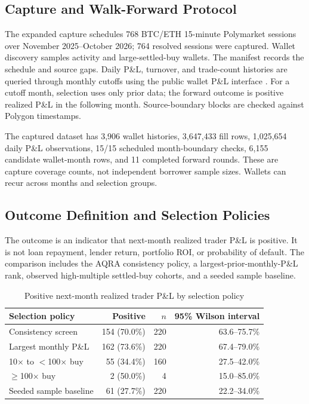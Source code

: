 \documentclass[conference]{IEEEtran}
\begin{document}
\subsection{Capture and Walk-Forward Protocol}
The expanded capture schedules 768 BTC/ETH 15-minute Polymarket sessions over November 2025--October 2026; 764 resolved sessions were captured. Wallet discovery samples activity and large-settled-buy wallets. The manifest records the schedule and source gaps. Daily P\&L, turnover, and trade-count histories are queried through monthly cutoffs using the public wallet P\&L interface \cite{polymarket-pnl}. For a cutoff month, selection uses only prior data; the forward outcome is positive realized P\&L in the following month. Source-boundary blocks are checked against Polygon timestamps.

The captured dataset has 3,906 wallet histories, 3,647,433 fill rows, 1,025,654 daily P\&L observations, 15/15 scheduled month-boundary checks, 6,155 candidate wallet-month rows, and 11 completed forward rounds. These are capture coverage counts, not independent borrower sample sizes. Wallets can recur across months and selection groups.

\subsection{Outcome Definition and Selection Policies}
The outcome is an indicator that next-month realized trader P\&L is positive. It is not loan repayment, lender return, portfolio ROI, or probability of default. The comparison includes the AQRA consistency policy, a largest-prior-monthly-P\&L rank, observed high-multiple settled-buy cohorts, and a seeded sample baseline.

\begin{table}[t]
\caption{Positive next-month realized trader P\&L by selection policy}
\label{tab:cohorts}
\centering
\small
\begin{tabular}{lrrr}
\toprule
Selection policy & Positive & $n$ & 95\% Wilson interval\\
\midrule
Consistency screen & 154 (70.0\%) & 220 & 63.6--75.7\%\\
Largest monthly P\&L & 162 (73.6\%) & 220 & 67.4--79.0\%\\
10$\times$ to $<$100$\times$ buy & 55 (34.4\%) & 160 & 27.5--42.0\%\\
$\geq$100$\times$ buy & 2 (50.0\%) & 4 & 15.0--85.0\%\\
Seeded sample baseline & 61 (27.7\%) & 220 & 22.2--34.0\%\\
\bottomrule
\end{tabular}
\end{table}
\end{document}
